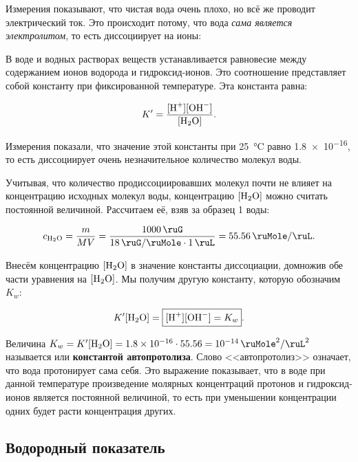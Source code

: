 Измерения показывают, что чистая вода очень плохо, но всё же проводит электрический ток. Это происходит потому, что вода \emph{сама является электролитом}, то есть диссоциирует на ионы:


В воде и водных растворах веществ устанавливается равновесие между содержанием ионов водорода и гидроксид-ионов. Это соотношение представляет собой константу при фиксированной температуре. Эта константа равна:

\begin{equation*}
    K' = \frac{[\ce{H^+}][\ce{OH^-}]}{[\ce{H2O}]}.
\end{equation*}

Измерения показали, что значение этой константы при \qty{25}{\degreeCelsius} равно \num{1,8e-16}, то есть диссоциирует очень незначительное количество молекул воды.

Учитывая, что количество продиссоциировавших молекул почти не влияет на концентрацию исходных молекул воды, концентрацию $[\ce{H2O}]$ можно считать постоянной величиной. Рассчитаем её, взяв за образец \qty{1}{\ruKg} воды:

\begin{equation*}
    c_{\ce{H2O}} = \frac{m}{MV} = \frac{\qty{1000}{\ruG}}{\qty{18}{\ruG\per\ruMole} \cdot \qty{1}{\ruL}} = \qty{55,56}{\ruMole\per\ruL}.
\end{equation*}

Внесём концентрацию $[\ce{H2O}]$ в значение константы диссоциации, домножив обе части уравнения на $[\ce{H2O}]$. Мы получим другую константу, которую обозначим $K_w$:

\begin{equation*}
    K'[\ce{H2O}] = \boxed{[\ce{H^+}][\ce{OH^-}] = K_w}.
\end{equation*}

Величина $K_w = K'[\ce{H2O}] = \num{1,8e-16} \cdot \num{55,56} = \qty{e-14}{\ruMole\squared\per\ruL\squared}$ называется  или \textbf{константой автопротолиза}. Слово <<автопротолиз>> означает, что вода протонирует сама себя. Это выражение показывает, что в воде при данной температуре произведение молярных концентраций протонов и гидроксид-ионов является постоянной величиной, то есть при уменьшении концентрации одних будет расти концентрация других.

\subsection*{Водородный показатель}

